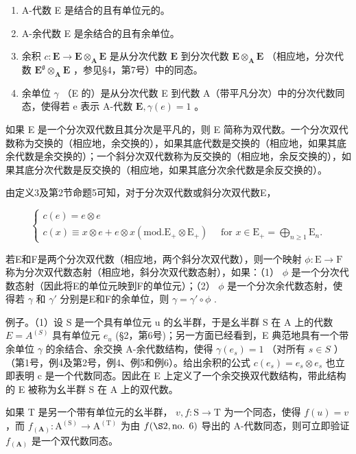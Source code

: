 \begin{enumerate}
\def\labelenumi{(\arabic{enumi})}
\item
  A-代数 E 是结合的且有单位元的。
\item
  A-余代数 E 是余结合的且有余单位。
\item
  余积 \(c: \mathbf{E} \to \mathbf{E} \otimes_{\mathbf{A}} \mathbf{E}\) 是从分次代数 \(\mathbf{E}\) 到分次代数 \(\mathbf{E} \otimes_{\mathbf{A}} \mathbf{E}\) （相应地，分次代数 \(\mathbf{E}^{\mathfrak{g}} \otimes_{\mathbf{A}} \mathbf{E}\) ，参见§4，第7号）中的同态。
\item
  余单位 \(\gamma\) （E 的）是从分次代数 E 到代数 A（带平凡分次）中的分次代数同态，使得若 e 表示 A-代数 \(\mathbf{E}, \gamma(e) = 1\) 。
\end{enumerate}

如果 E 是一个分次双代数且其分次是平凡的，则 E 简称为双代数。一个分次双代数称为交换的（相应地，余交换的），如果其底代数是交换的（相应地，如果其底余代数是余交换的）；一个斜分次双代数称为反交换的（相应地，余反交换的），如果其底分次代数是反交换的（相应地，如果其底分次余代数是余反交换的）。

由定义3及第2节命题5可知，对于分次双代数或斜分次双代数E，

\[
\left\{ \begin{array}{c} c (e) = e \otimes e \\ c (x) \equiv x \otimes e + e \otimes x (\mathrm{mod.} \mathrm{E} _ {+} \otimes \mathrm{E} _ {+}) \quad \text { for } x \in \mathrm{E} _ {+} = \bigoplus_ {n \geqslant 1} \mathrm{E} _ {n}. \end{array} \right.\tag{22}
\]

若E和F是两个分次双代数（相应地，两个斜分次双代数），则一个映射 \(\phi: \mathrm{E} \to \mathrm{F}\) 称为分次双代数态射（相应地，斜分次双代数态射），如果：（1） \(\phi\) 是一个分次代数态射（因此将E的单位元映到F的单位元）；（2） \(\phi\) 是一个分次余代数态射，使得若 \(\gamma\) 和 \(\gamma'\) 分别是E和F的余单位，则 \(\gamma = \gamma' \circ \phi\) .

例子。（1）设 S 是一个具有单位元 u 的幺半群，于是幺半群 S 在 A 上的代数 \(E = A^{(S)}\) 具有单位元 \(e_{u}\) (§2，第6号)；另一方面已经看到，E 典范地具有一个带余单位 \(\gamma\) 的余结合、余交换 A-余代数结构，使得 \(\gamma(e_{s}) = 1\) （对所有 \(s \in S\) ）（第1号，例4及第2号，例4、例5和例6）。给出余积的公式 \(c(e_{s}) = e_{s} \otimes e_{s}\) 也立即表明 c 是一个代数同态。因此在 E 上定义了一个余交换双代数结构，带此结构的 E 被称为幺半群 S 在 A 上的双代数。

如果 T 是另一个带有单位元的幺半群， \(v, f: \mathrm{S} \to \mathrm{T}\) 为一个同态，使得 \(f(u) = v\) ，而 \(f_{(\mathbf{A})}: \mathrm{A}^{(\mathrm{S})} \to \mathrm{A}^{(\mathrm{T})}\) 为由 \(f(\S 2, \text{no. } 6)\) 导出的 A-代数同态，则可立即验证 \(f_{(\mathbf{A})}\) 是一个双代数同态。

